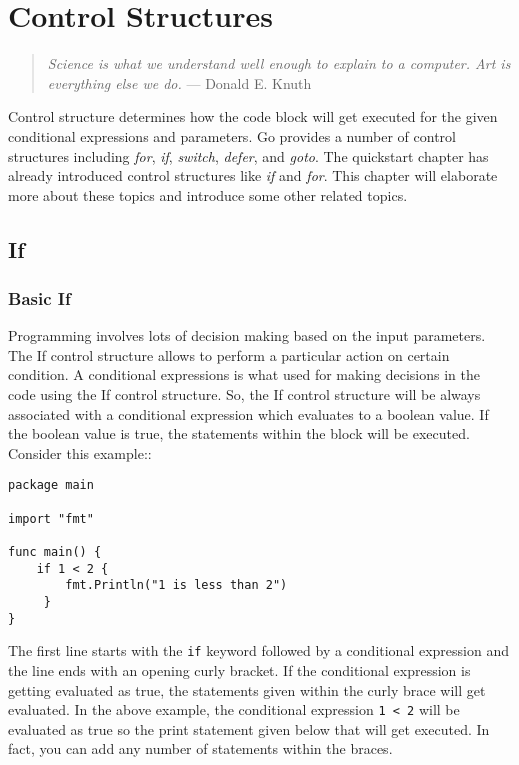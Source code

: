 \cleardoublepage
{}
\chapter{Control Structures}

\begin{quote}
\textit{Science is what we understand well enough to explain to a
computer. Art is everything else we do.} --- Donald E. Knuth
\end{quote}

Control structure determines how the code block will get executed for
the given conditional expressions and parameters.  Go provides a
number of control structures
including \textit{for}, \textit{if}, \textit{switch}, \textit{defer},
and \textit{goto}.  The quickstart chapter has already introduced
control structures like \textit{if} and \textit{for}.  This chapter
will elaborate more about these topics and introduce some other
related topics.

\section{If}

\subsection{Basic If}

Programming involves lots of decision making based on the input
parameters.  The If control structure allows to perform a
particular action on certain condition.  A conditional expressions is
what used for making decisions in the code using the If control
structure.  So, the If control structure will be always associated
with a conditional expression which evaluates to a boolean value.  If
the boolean value is true, the statements within the block will be
executed.  Consider this example::

\begin{lstlisting}[caption=If example program]
package main

import "fmt"

func main() {
    if 1 < 2 {
        fmt.Println("1 is less than 2")
     }
}
\end{lstlisting}

The first line starts with the \texttt{if} keyword followed by a
conditional expression and the line ends with an opening curly
bracket.  If the conditional expression is getting evaluated as true,
the statements given within the curly brace will get evaluated.  In
the above example, the conditional expression \texttt{1 < 2} will be
evaluated as true so the print statement given below that will get
executed.  In fact, you can add any number of statements within the
braces.

